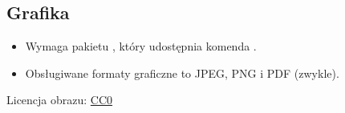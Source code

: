 \documentclass{beamer}
\begin{document}
\subsection{Grafika}
\begin{frame}[fragile]{\insertsubsection}
\begin{itemize}
\item Wymaga pakietu , który udostępnia komenda .
\item Obsługiwane formaty graficzne to JPEG, PNG i PDF (zwykle).
\end{itemize}

\tiny{Licencja obrazu: \href{https://pixabay.com/en/animal-apple-attractive-beautiful-1239390/}{CC0}}
\end{frame}
\end{document}
